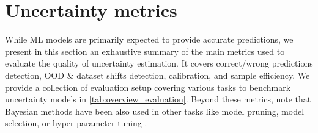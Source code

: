 
\section{Uncertainty metrics}
\label{sec:background-experiments}

While ML models are primarily expected to provide accurate predictions, we present in this section an exhaustive summary of the main metrics used to evaluate the quality of uncertainty estimation. 
It covers correct/wrong predictions detection, OOD \& dataset shifts detection, calibration, and sample efficiency.
We provide a collection of evaluation setup covering various tasks to benchmark uncertainty models in \cref{tab:overview_evaluation}. Beyond these metrics, note that Bayesian methods have been also used in other tasks like  model pruning, model selection, or hyper-parameter tuning \citep{bayesian-networks,daxberger2021laplace}.

